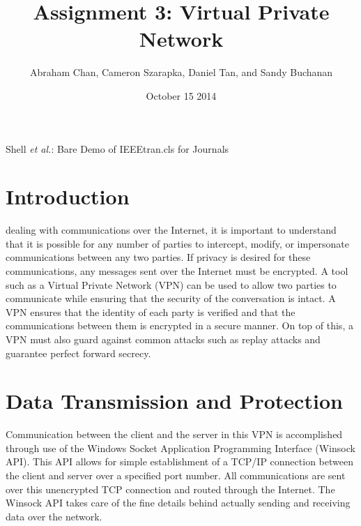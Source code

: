 \documentclass[journal]{IEEEtran}
\date{October 15 2014}
\title{Assignment 3: Virtual Private Network}
\author{Abraham Chan,
	Cameron Szarapka,
	Daniel Tan,
	and Sandy Buchanan}
\begin{document}
\maketitle

%
{Shell \MakeLowercase{\textit{et al.}}: Bare Demo of IEEEtran.cls for Journals}


\section{Introduction}

 dealing with communications over the Internet, it is important to understand that it is possible for any number of parties to intercept, modify, or impersonate communications between any two parties. If privacy is desired for these communications, any messages sent over the Internet must be encrypted. A tool such as a Virtual Private Network (VPN) can be used to allow two parties to communicate while ensuring that the security of the conversation is intact. A VPN ensures that the identity of each party is verified and that the communications between them is encrypted in a secure manner. On top of this, a VPN must also guard against common attacks such as replay attacks and guarantee perfect forward secrecy.


\section{Data Transmission and Protection}
Communication between the client and the server in this VPN is accomplished through use of the Windows Socket Application Programming Interface (Winsock API)\cite{sockets}. This API allows for simple establishment of a TCP/IP connection between the client and server over a specified port number. All communications are sent over this unencrypted TCP connection and routed through the Internet. The Winsock API takes care of the fine details behind actually sending and receiving data over the network.
\end{document}
